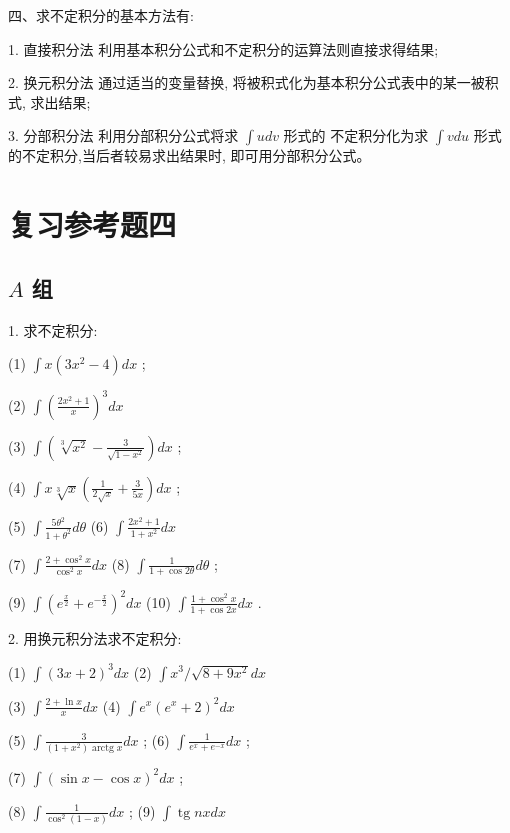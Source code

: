 \documentclass[lang=cn,newtx,12pt,scheme=chinese]{elegantbook}
\begin{document}
四、求不定积分的基本方法有:

1. 直接积分法 利用基本积分公式和不定积分的运算法则直接求得结果;

2. 换元积分法 通过适当的变量替换, 将被积式化为基本积分公式表中的某一被积式, 求出结果;

3. 分部积分法 利用分部积分公式将求 \(\int {udv}\) 形式的 不定积分化为求 \(\int {vdu}\) 形式的不定积分,当后者较易求出结果时, 即可用分部积分公式。

\chapter*{复习参考题四}

\section*{\(A\) 组}

1. 求不定积分:

(1) \(\int x\left( {3{x}^{2} - 4}\right) {dx}\) ;

(2) \(\int {\left( \frac{2{x}^{2} + 1}{x}\right) }^{3}{dx}\)

(3) \(\int \left( {\sqrt[3]{{x}^{2}} - \frac{3}{\sqrt{1 - {x}^{2}}}}\right) {dx}\) ;

(4) \(\int x\sqrt[3]{x}\left( {\frac{1}{2\sqrt{x}} + \frac{3}{5x}}\right) {dx}\) ;

(5) \(\int \frac{5{\theta }^{2}}{1 + {\theta }^{2}}{d\theta }\) (6) \(\int \frac{2{x}^{2} + 1}{1 + {x}^{2}}{dx}\)

(7) \(\int \frac{2 + {\cos }^{2}x}{{\cos }^{2}x}{dx}\) (8) \(\int \frac{1}{1 + \cos {2\theta }}{d\theta }\) ;

(9) \(\int {\left( {e}^{\frac{x}{2}} + {e}^{-\frac{x}{2}}\right) }^{2}{dx}\) (10) \(\int \frac{1 + {\cos }^{2}x}{1 + \cos {2x}}{dx}\) .

2. 用换元积分法求不定积分:

(1) \(\int {\left( 3x + 2\right) }^{3}{dx}\) (2) \(\int {x}^{3}/\sqrt{8 + 9{x}^{2}}{dx}\)

(3) \(\int \frac{2 + \ln x}{x}{dx}\) (4) \(\int {e}^{x}{\left( {e}^{x} + 2\right) }^{2}{dx}\)

(5) \(\int \frac{3}{\left( {1 + {x}^{2}}\right) \operatorname{arctg}x}{dx}\) ; (6) \(\int \frac{1}{{e}^{x} + {e}^{-x}}{dx}\) ;

(7) \(\int {\left( \sin x - \cos x\right) }^{2}{dx}\) ;

(8) \(\int \frac{1}{{\cos }^{2}\left( {1 - x}\right) }{dx}\) ; (9) \(\int \operatorname{tg}{nxdx}\)
\end{document}
